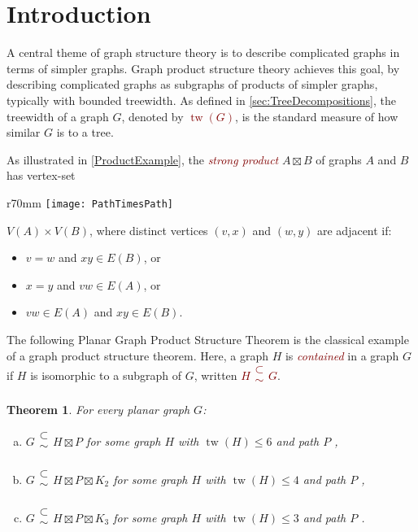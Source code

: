 \documentclass[11pt]{article}
\newcommand{\defn}[1]{\textcolor{Maroon}{\emph{#1}}}
\renewcommand{\leq}{\leqslant}
\newcommand{\subsetsim}{\mathrel{\substack{\textstyle\subset\\[-0.3ex]\textstyle\sim\\[-0.4ex]}}}
\newcommand{\StrongProd}{\mathbin{\boxtimes}}
\DeclareMathOperator{\tw}{tw}
\theoremstyle{plain}
\newtheorem{thm}{Theorem}
\theoremstyle{definition}
\begin{document}
	\section{Introduction}\label{sec:intro}
	
A central theme of graph structure theory is to describe complicated graphs in terms of simpler graphs. Graph product structure theory achieves this goal, by describing complicated graphs as subgraphs of products of simpler graphs, typically with bounded treewidth. As defined in \cref{sec:TreeDecompositions}, the treewidth of a graph $G$, denoted by \defn{$\tw(G)$}, is the standard measure of how similar $G$ is to a tree.
	
As illustrated in \cref{ProductExample}, the \defn{strong product} $A \StrongProd B$ of graphs  $A$ and $B$ has vertex-set
	\begin{wrapfigure}[10]{r}{70mm}
		\centering
		\texttt{[image: PathTimesPath]}
		\caption{\label{ProductExample} Strong product of two paths.}
	\end{wrapfigure}
	$V(A) \times V(B)$, where distinct vertices $(v,x)$ and $(w,y)$ are adjacent if:
	\begin{itemize}
		\item $v = w$ and $xy \in E(B)$, or 
		\item $x = y$ and $vw \in E(A)$, or
		\item $vw\in E(A)$ and $xy \in E(B)$.
	\end{itemize}
	
	
	The following Planar Graph Product Structure Theorem is the classical example of a graph product structure theorem. Here, a graph $H$ is \defn{contained} in a graph $G$ if $H$ is isomorphic to a subgraph of $G$, written \defn{$H \subsetsim G$}. 
	
	\begin{thm}
		\label{PGPST} 
		For every planar graph $G$:
		\begin{enumerate}[(a)]
			\item $G\subsetsim H \StrongProd P$ for some graph $H$ with $\tw(H)\leq 6$ and path $P$ \textup{\citep{UWY22}},
			\item $G\subsetsim H \StrongProd P \StrongProd K_2$ for some graph $H$ with $\tw(H)\leq 4$ and path $P$ \textup{\citep{UWY22}},
			\item $G\subsetsim H \StrongProd P \StrongProd K_3$ for some graph $H$ with $\tw(H)\leq 3$ and path $P$ \textup{\citep{DJMMUW20}}.
		\end{enumerate}
	\end{thm}
	
\end{document}
